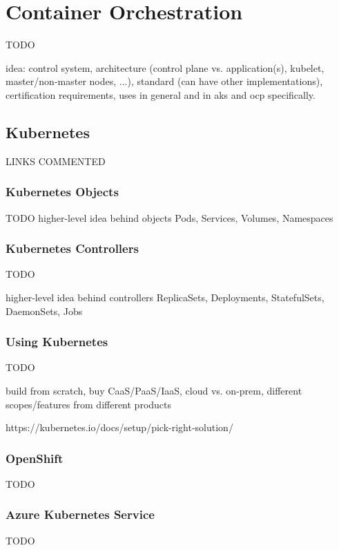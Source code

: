 \section{Container Orchestration}
TODO

idea: control system, architecture (control plane vs. application(s), kubelet, master/non-master nodes, ...), standard (can have other implementations), certification requirements, uses in general and in \gls{aks} and \gls{ocp} specifically.

\subsection{Kubernetes}
LINKS COMMENTED


\subsubsection{Kubernetes Objects}
TODO
higher-level idea behind objects
Pods, Services, Volumes, Namespaces

\subsubsection{Kubernetes Controllers}
TODO

higher-level idea behind controllers
ReplicaSets, Deployments, StatefulSets, DaemonSets, Jobs

\subsubsection{Using Kubernetes}
TODO

build from scratch, buy CaaS/PaaS/IaaS, cloud vs. on-prem, different scopes/features from different products

https://kubernetes.io/docs/setup/pick-right-solution/

\subsubsection{OpenShift}
TODO

\subsubsection{Azure Kubernetes Service}
TODO

